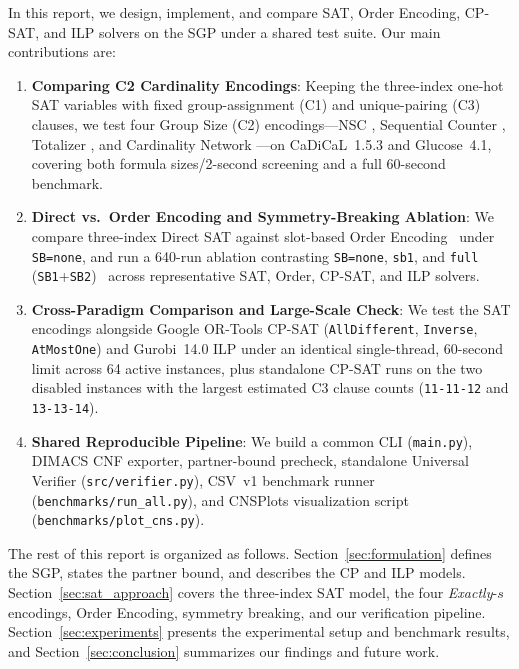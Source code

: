 \documentclass[a4paper,fleqn]{cas-sc}
\begin{document}
In this report, we design, implement, and compare SAT, Order Encoding, CP-SAT, and ILP solvers on the SGP under a shared test suite. Our main contributions are:
\begin{enumerate}[label=(\arabic*),noitemsep]
    \item \textbf{Comparing C2 Cardinality Encodings}: Keeping the three-index one-hot SAT variables with fixed group-assignment (C1) and unique-pairing (C3) clauses, we test four Group Size (C2) encodings---NSC \cite{kieu2025nse}, Sequential Counter \cite{sinz2005towards}, Totalizer \cite{bailleux2003totalizer}, and Cardinality Network \cite{asin2009cardnet}---on CaDiCaL~1.5.3 and Glucose~4.1, covering both formula sizes/2-second screening and a full 60-second benchmark.
    \item \textbf{Direct vs.\ Order Encoding and Symmetry-Breaking Ablation}: We compare three-index Direct SAT against slot-based Order Encoding~\cite{tamura2009order} under \texttt{SB=none}, and run a 640-run ablation contrasting \texttt{SB=none}, \texttt{sb1}, and \texttt{full} (\texttt{SB1}+\texttt{SB2})~\cite{kieu2025nse} across representative SAT, Order, CP-SAT, and ILP solvers.
    \item \textbf{Cross-Paradigm Comparison and Large-Scale Check}: We test the SAT encodings alongside Google OR-Tools CP-SAT (\texttt{AllDifferent}, \texttt{Inverse}, \texttt{AtMostOne}) and Gurobi~14.0 ILP under an identical single-thread, 60-second limit across 64 active instances, plus standalone CP-SAT runs on the two disabled instances with the largest estimated C3 clause counts (\texttt{11-11-12} and \texttt{13-13-14}).
    \item \textbf{Shared Reproducible Pipeline}: We build a common CLI (\texttt{main.py}), DIMACS CNF exporter, partner-bound precheck, standalone Universal Verifier (\texttt{src/\allowbreak verifier.py}), CSV~v1 benchmark runner (\texttt{benchmarks/\allowbreak run\_\allowbreak all.py}), and CNSPlots visualization script (\texttt{benchmarks/\allowbreak plot\_\allowbreak cns.py}).
\end{enumerate}

The rest of this report is organized as follows. Section~\ref{sec:formulation} defines the SGP, states the partner bound, and describes the CP and ILP models. Section~\ref{sec:sat_approach} covers the three-index SAT model, the four \textit{Exactly}-$s$ encodings, Order Encoding, symmetry breaking, and our verification pipeline. Section~\ref{sec:experiments} presents the experimental setup and benchmark results, and Section~\ref{sec:conclusion} summarizes our findings and future work.
\end{document}
